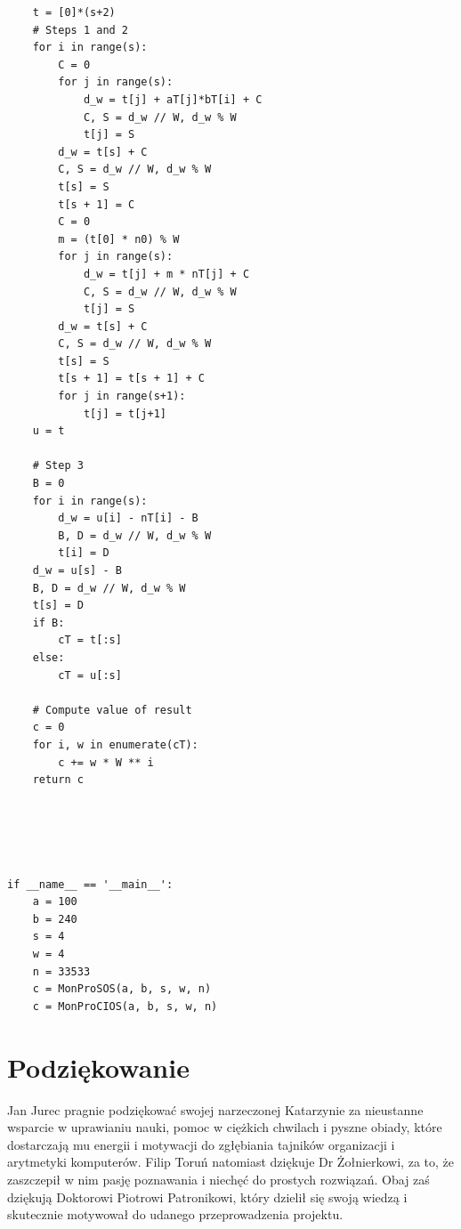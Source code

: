 \documentclass[10pt,journal,compsoc]{IEEEtran}
\begin{document}
\begin{lstlisting}
    t = [0]*(s+2)
    # Steps 1 and 2
    for i in range(s):
        C = 0
        for j in range(s):
            d_w = t[j] + aT[j]*bT[i] + C
            C, S = d_w // W, d_w % W
            t[j] = S
        d_w = t[s] + C
        C, S = d_w // W, d_w % W
        t[s] = S
        t[s + 1] = C
        C = 0
        m = (t[0] * n0) % W
        for j in range(s):
            d_w = t[j] + m * nT[j] + C
            C, S = d_w // W, d_w % W
            t[j] = S
        d_w = t[s] + C
        C, S = d_w // W, d_w % W
        t[s] = S
        t[s + 1] = t[s + 1] + C
        for j in range(s+1):
            t[j] = t[j+1]
    u = t

    # Step 3
    B = 0
    for i in range(s):
        d_w = u[i] - nT[i] - B
        B, D = d_w // W, d_w % W
        t[i] = D
    d_w = u[s] - B
    B, D = d_w // W, d_w % W
    t[s] = D
    if B:
        cT = t[:s]
    else:
        cT = u[:s]

    # Compute value of result
    c = 0
    for i, w in enumerate(cT):
        c += w * W ** i
    return c

    


    
if __name__ == '__main__':
    a = 100
    b = 240
    s = 4
    w = 4
    n = 33533
    c = MonProSOS(a, b, s, w, n)
    c = MonProCIOS(a, b, s, w, n)
\end{lstlisting} 


\section*{Podziękowanie}

Jan Jurec pragnie podziękować swojej narzeczonej Katarzynie za nieustanne wsparcie w uprawianiu nauki, pomoc w ciężkich chwilach i pyszne obiady, które dostarczają mu energii i motywacji do zgłębiania tajników organizacji i arytmetyki komputerów.
Filip Toruń natomiast dziękuje Dr Żołnierkowi, za to, że zaszczepił w nim pasję poznawania i niechęć do prostych rozwiązań.
Obaj zaś dziękują Doktorowi Piotrowi Patronikowi, który dzielił się swoją wiedzą i skutecznie motywował do udanego przeprowadzenia projektu.
\end{document}
